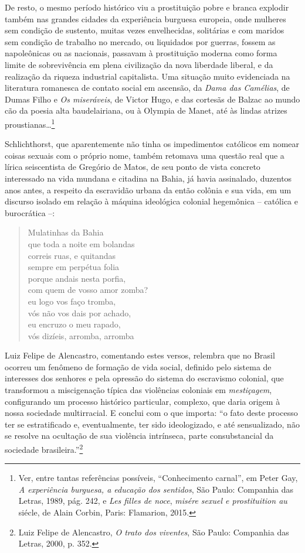 De resto, o mesmo período histórico viu a prostituição pobre e branca
explodir também nas grandes cidades da experiência burguesa europeia,
onde mulheres sem condição de sustento, muitas vezes envelhecidas,
solitárias e com maridos sem condição de trabalho no mercado, ou
liquidados por guerras, fossem as napoleônicas ou as nacionais, passavam
à prostituição moderna como forma limite de sobrevivência em plena
civilização da nova liberdade liberal, e da realização da riqueza
industrial capitalista. Uma situação muito evidenciada na literatura
romanesca de contato social em ascensão, da \emph{Dama das Camélias}, de
Dumas Filho e \emph{Os miseráveis}, de Victor Hugo, e das cortesãs de
Balzac ao mundo cão da poesia alta baudelairiana, ou à Olympia de Manet,
até às lindas atrizes proustianas\ldots{}\footnote{Ver, entre tantas
  referências possíveis, ``Conhecimento carnal'', em Peter Gay, \emph{A
  experiência burguesa, a educação dos sentidos}, São Paulo: Companhia
  das Letras, 1989, pág. 242, e \emph{Les filles de noce}, \emph{misére
  sexuel e prostituition au } siécle, de Alain Corbin, Paris:
  Flamarion, 2015.}

Schlichthorst, que aparentemente não tinha os impedimentos católicos em
nomear coisas sexuais com o próprio nome, também retomava uma questão
real que a lírica seiscentista de Gregório de Matos, de seu ponto de
vista concreto interessado na vida mundana e citadina na Bahia, já havia
assinalado, duzentos anos antes, a respeito da escravidão urbana da
então colônia e sua vida, em um discurso isolado em relação à máquina
ideológica colonial hegemônica -- católica e burocrática --:

\begin{verse}
Mulatinhas da Bahia\\
que toda a noite em bolandas\\
correis ruas, e quitandas\\
sempre em perpétua folia\\
porque andais nesta porfia,\\
com quem de vosso amor zomba?\\
eu logo vos faço tromba,\\
vós não vos dais por achado,\\
eu encruzo o meu rapado,\\
vós dizíeis, arromba, arromba
\end{verse}

Luiz Felipe de Alencastro, comentando estes versos, relembra que no
Brasil ocorreu um fenômeno de formação de vida social, definido pelo
sistema de interesses dos senhores e pela opressão do sistema do
escravismo colonial, que transformou a miscigenação típica das
violências coloniais em \emph{mestiçagem}, configurando um processo
histórico particular, complexo, que daria origem à nossa sociedade
multirracial. E conclui com o que importa: ``o fato deste processo ter
se estratificado e, eventualmente, ter sido ideologizado, e até
sensualizado, não se resolve na ocultação de sua violência intrínseca,
parte consubstancial da sociedade brasileira.''\footnote{Luiz Felipe de
  Alencastro, \emph{O trato dos viventes}, São Paulo: Companhia das
  Letras, 2000, p. 352.}

